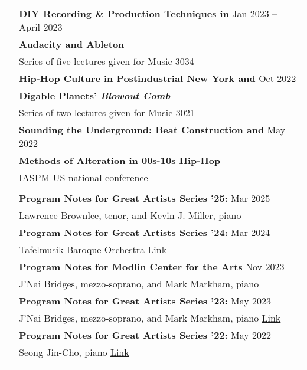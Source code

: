 \documentclass[letterpaper, 11pt]{article}
\begin{document}
\begin{longtable}{p{1.3in}p{4.8in}}
& \textbf{DIY Recording \& Production Techniques in} \hfill{Jan 2023 -- April 2023} \\
& \textbf{Audacity and Ableton} \\
& Series of five lectures given for Music 3034 \\
& \textbf{Hip-Hop Culture in Postindustrial New York and} \hfill{Oct 2022} \\
& \textbf{Digable Planets' \textit{Blowout Comb}} \\
& Series of two lectures given for Music 3021 \\
& \textbf{Sounding the Underground: Beat Construction and} \hfill{May 2022} \\
& \textbf{Methods of Alteration in 00s-10s Hip-Hop} \\
& IASPM-US national conference \\
& \\

\nohyphens{\color{OliveGreen}{Public Scholarship}} 
& \textbf{Program Notes for Great Artists Series '25:} \hfill{Mar 2025} \\
& Lawrence Brownlee, tenor, and Kevin J. Miller, piano \\
& \textbf{Program Notes for Great Artists Series '24:} \hfill{Mar 2024} \\
& Tafelmusik Baroque Orchestra \hfill \href{https://drive.google.com/file/d/1PLRyvU2Tgae-y5dHgYk3dIMzmQKZlSIq/view?usp=sharing}{Link} \\
& \textbf{Program Notes for Modlin Center for the Arts} \hfill{Nov 2023} \\
& J'Nai Bridges, mezzo-soprano, and Mark Markham, piano \hfill \\
& \textbf{Program Notes for Great Artists Series '23:} \hfill{May 2023} \\
& J'Nai Bridges, mezzo-soprano, and Mark Markham, piano \hfill \href{https://drive.google.com/file/d/1VVsDLn_SQQVU6xove93dTyiRJL8_1enJ/view?usp=sharing}{Link} \\
& \textbf{Program Notes for Great Artists Series '22:} \hfill{May 2022} \\
& Seong Jin-Cho, piano \hfill \href{https://music.wustl.edu/events/great-artists-series-cho?d=2022-05-01}{Link} \\
& \\


\end{longtable}
\end{document}

